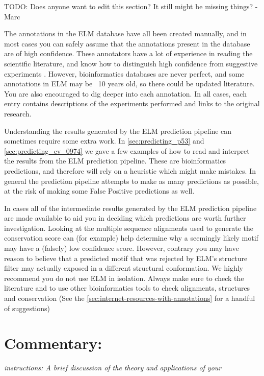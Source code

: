 \documentclass[12pt]{article}
\begin{document}
	TODO: Does anyone want to edit this section? It still might be missing things? -Marc

	The annotations in the ELM database have all been created manually, and in most cases
	you can safely assume that the annotations present in the database are of
	high confidence.
	These annotators have a lot of experience in reading the scientific literature,
	and know how to distinguish high confidence from suggestive experiments
	\cite{26581338}.
	However, bioinformatics databases are never perfect, and some annotations in
	ELM may be ~10 years old, so there could be updated literature.
	You are also encouraged to dig deeper into each annotation.
	In all cases, each entry contains descriptions of the experiments performed and
	links to the original research.

	Understanding the results generated by the ELM prediction pipeline 
	can sometimes require some extra work.
	In \ref{sec:predicting_p53} and \ref{sec:predicting_cv_0974} we gave a few
	examples of how to read and interpret the results from the ELM prediction
	pipeline.
	These are bioinformatics predictions, and therefore will rely
	on a heuristic which might make mistakes.
	In general the  prediction pipeline attempts to make as many predictions as
	possible, at the risk of making some False Positive predictions as well.

	In cases all of the intermediate results generated by the ELM prediction
	pipeline are made available to aid you in deciding which predictions are worth
	further investigation.
	Looking at the multiple sequence alignments used to generate the conservation
	score can (for example) help determine why a seemingly likely motif may have a
	(falsely) low confidence score.
	However, contrary you may have reason to believe that a predicted motif that was
	rejected by ELM's structure filter may actually exposed in a different
	structural conformation.
	We highly recommend you do not use ELM in isolation. Always make sure to check
	the literature and to use other bioinformatics tools to check alignments, structures and conservation (See the \ref{sec:internet-resources-with-annotations} for a handful of suggestions)

	\section*{Commentary:}\label{commentary}

	\emph{instructions: A brief discussion of the theory and applications of
	your}
\end{document}
